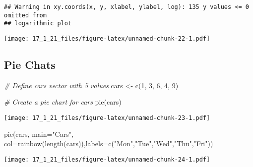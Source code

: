 \documentclass[
]{article}
\newenvironment{Shaded}{\begin{snugshade}}{\end{snugshade}}
\newcommand{\AttributeTok}[1]{\textcolor[rgb]{0.77,0.63,0.00}{#1}}
\newcommand{\CommentTok}[1]{\textcolor[rgb]{0.56,0.35,0.01}{\textit{#1}}}
\newcommand{\DecValTok}[1]{\textcolor[rgb]{0.00,0.00,0.81}{#1}}
\newcommand{\FunctionTok}[1]{\textcolor[rgb]{0.00,0.00,0.00}{#1}}
\newcommand{\NormalTok}[1]{#1}
\newcommand{\OtherTok}[1]{\textcolor[rgb]{0.56,0.35,0.01}{#1}}
\newcommand{\StringTok}[1]{\textcolor[rgb]{0.31,0.60,0.02}{#1}}
\begin{document}
\begin{verbatim}
## Warning in xy.coords(x, y, xlabel, ylabel, log): 135 y values <= 0 omitted from
## logarithmic plot
\end{verbatim}

\texttt{[image: 17\_1\_21\_files/figure-latex/unnamed-chunk-22-1.pdf]}

\hypertarget{pie-chats}{%
\subsection{Pie Chats}\label{pie-chats}}

\begin{Shaded}
\begin{Highlighting}[]
\CommentTok{\# Define cars vector with 5 values}
\NormalTok{cars }\OtherTok{\textless{}{-}} \FunctionTok{c}\NormalTok{(}\DecValTok{1}\NormalTok{, }\DecValTok{3}\NormalTok{, }\DecValTok{6}\NormalTok{, }\DecValTok{4}\NormalTok{, }\DecValTok{9}\NormalTok{)}

\CommentTok{\# Create a pie chart for cars}
\FunctionTok{pie}\NormalTok{(cars)}
\end{Highlighting}
\end{Shaded}

\texttt{[image: 17\_1\_21\_files/figure-latex/unnamed-chunk-23-1.pdf]}

\begin{Shaded}
\begin{Highlighting}[]
\FunctionTok{pie}\NormalTok{(cars, }\AttributeTok{main=}\StringTok{"Cars"}\NormalTok{, }\AttributeTok{col=}\FunctionTok{rainbow}\NormalTok{(}\FunctionTok{length}\NormalTok{(cars)),}\AttributeTok{labels=}\FunctionTok{c}\NormalTok{(}\StringTok{"Mon"}\NormalTok{,}\StringTok{"Tue"}\NormalTok{,}\StringTok{"Wed"}\NormalTok{,}\StringTok{"Thu"}\NormalTok{,}\StringTok{"Fri"}\NormalTok{))}
\end{Highlighting}
\end{Shaded}

\texttt{[image: 17\_1\_21\_files/figure-latex/unnamed-chunk-24-1.pdf]}
\end{document}
